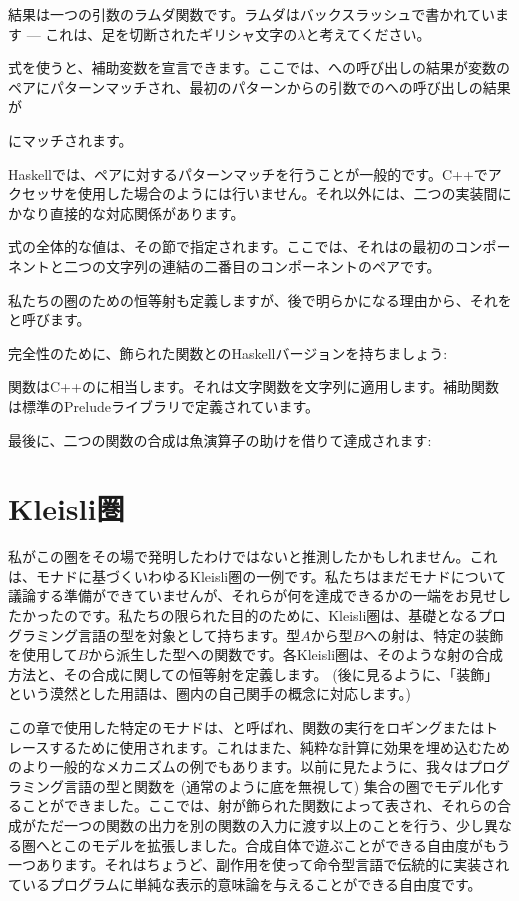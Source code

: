 結果は一つの引数のラムダ関数です。ラムダはバックスラッシュで書かれています --- これは、足を切断されたギリシャ文字の$\lambda$と考えてください。

式を使うと、補助変数を宣言できます。ここでは、への呼び出しの結果が変数のペアにパターンマッチされ、最初のパターンからの引数でのへの呼び出しの結果が

にマッチされます。

Haskellでは、ペアに対するパターンマッチを行うことが一般的です。C++でアクセッサを使用した場合のようには行いません。それ以外には、二つの実装間にかなり直接的な対応関係があります。

式の全体的な値は、その節で指定されます。ここでは、それはの最初のコンポーネントと二つの文字列の連結の二番目のコンポーネントのペアです。

私たちの圏のための恒等射も定義しますが、後で明らかになる理由から、それをと呼びます。

完全性のために、飾られた関数とのHaskellバージョンを持ちましょう:

関数はC++のに相当します。それは文字関数を文字列に適用します。補助関数は標準のPreludeライブラリで定義されています。

最後に、二つの関数の合成は魚演算子の助けを借りて達成されます:


\section{Kleisli圏}

私がこの圏をその場で発明したわけではないと推測したかもしれません。これは、モナドに基づくいわゆるKleisli圏の一例です。私たちはまだモナドについて議論する準備ができていませんが、それらが何を達成できるかの一端をお見せしたかったのです。私たちの限られた目的のために、Kleisli圏は、基礎となるプログラミング言語の型を対象として持ちます。型$A$から型$B$への射は、特定の装飾を使用して$B$から派生した型への関数です。各Kleisli圏は、そのような射の合成方法と、その合成に関しての恒等射を定義します。 (後に見るように、「装飾」という漠然とした用語は、圏内の自己関手の概念に対応します。) 

この章で使用した特定のモナドは、と呼ばれ、関数の実行をロギングまたはトレースするために使用されます。これはまた、純粋な計算に効果を埋め込むためのより一般的なメカニズムの例でもあります。以前に見たように、我々はプログラミング言語の型と関数を (通常のように底を無視して) 集合の圏でモデル化することができました。ここでは、射が飾られた関数によって表され、それらの合成がただ一つの関数の出力を別の関数の入力に渡す以上のことを行う、少し異なる圏へとこのモデルを拡張しました。合成自体で遊ぶことができる自由度がもう一つあります。それはちょうど、副作用を使って命令型言語で伝統的に実装されているプログラムに単純な表示的意味論を与えることができる自由度です。


